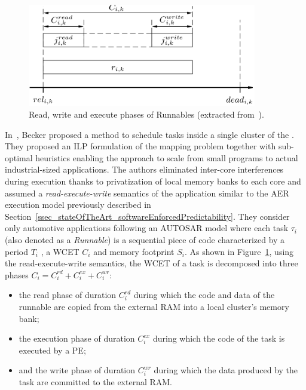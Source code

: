 \documentclass[main.tex]{subfiles}
\begin{document}
\begin{figure}
    \centering
    \includegraphics[width=10cm]{imgs/png/stateOfTheArt_2_RdWrExPhases.png}
    \caption{Read, write and execute phases of Runnables (extracted from~\cite{Becker16}).}
    \label{fig_stateOfTheArt_2_RdWeExPhases}
\end{figure}

In~\cite{Becker16}, Becker \etal proposed a method to schedule tasks inside a single cluster of the \mppalong. They proposed an ILP formulation of the mapping problem together with sub-optimal heuristics enabling the approach to scale from small programs to actual industrial-sized applications. The authors eliminated inter-core interferences during execution thanks to privatization of local memory banks to each core and assumed a \emph{read-execute-write} semantics of the application similar to the AER execution model previously described in Section~\ref{ssec_stateOfTheArt_softwareEnforcedPredictability}. They consider only automotive applications following an AUTOSAR model where each task $\tau_i$ (also denoted as a \emph{Runnable}) is a sequential piece of code characterized by a period $T_i$ , a WCET $C_i$ and memory footprint $S_i$. As shown in Figure~\ref{fig_stateOfTheArt_2_RdWeExPhases}, using the read-execute-write semantics, the WCET of a task is decomposed into three phases $C_i = C_i^{rd} + C_i^{ex} +C_i^{wr}$:
\begin{itemize}
    \item the read phase of duration $C_i^{rd}$ during which the code and data of the runnable are copied from the external RAM into a local cluster's memory bank;
    \item the execution phase of duration $C_i^{ex}$ during which the code of the task is executed by a PE;
    \item and the write phase of duration $C_i^{wr}$ during which the data produced by the task are committed to the external RAM.
\end{itemize}
\end{document}
